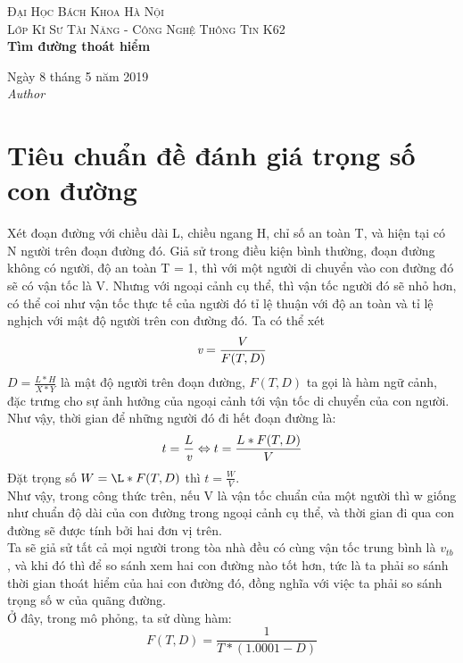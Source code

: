 \documentclass{article}
\begin{document}
\textsc{\LARGE Đại Học Bách Khoa Hà Nội} \\[1,5cm]
\textsc{\large Lớp Kĩ Sư Tài Năng - Công Nghệ Thông Tin K62} \\[0.5cm]
{\huge\bfseries Tìm đường thoát hiểm }\\[0.4cm] 

    \begin{flushleft}
        \large
        Ngày 8 tháng 5 năm 2019 \\[0.5cm]
        \textit{Author}\\[0,3cm]
           
    \end{flushleft}
    
    \section{Tiêu chuẩn đề đánh giá trọng số con đường}
    Xét đoạn đường với chiều dài L, chiều ngang H, chỉ số an toàn T,
    và hiện tại có N người trên đoạn đường đó. Giả sử trong điều 
    kiện bình thường, đoạn đường không có người, độ an toàn T = 1, 
    thì với một người di chuyển vào con đường đó sẽ có vận tốc là V.
    Nhưng với ngoại cảnh cụ thể, thì vận tốc người đó sẽ nhỏ hơn,
    có thể coi như vận tốc thực tế của người đó tỉ lệ thuận với độ 
    an toàn và tỉ lệ nghịch với mật độ người trên con đường đó.
    Ta có thể xét 
    \begin{equation*}
        \emph{v} = \frac{V}{F(T, D)}
    \end{equation*} 
    $D = \frac{L*H}{X*Y}$ là mật độ người trên đoạn đường,
    $F(T, D)$ ta gọi là hàm ngữ cảnh, đặc trưng cho sự ảnh hưởng
    của ngoại cảnh tới vận tốc di chuyển của con người.
    Như vậy, thời gian để những người đó đi hết đoạn đường là:
    \begin{displaymath}
        t = \frac{L}{\emph{v}}  
        \Leftrightarrow t = \frac{L*F(T, D)}{V}   
    \end{displaymath}
    Đặt trọng số $W = \L*F(T, D)$ thì $t = \frac{W}{V}$. \\
    Như vậy, trong công thức trên, nếu V là vận tốc chuẩn của một 
    người thì w giống như chuẩn độ dài của con đường trong ngoại 
    cảnh cụ thể, và thời gian đi qua con đường sẽ được tính bởi 
    hai đơn vị trên. \\
    Ta sẽ giả sử tất cả mọi người trong tòa nhà đều có cùng vận tốc
    trung bình là $v_{tb}$, và khi đó thì để so sánh xem hai con
    đường nào tốt hơn, tức là ta phải so sánh thời gian thoát hiểm 
    của hai con đường đó, đồng nghĩa với việc ta phải so sánh trọng 
    số w của quãng đường. \\ 
    Ở đây, trong mô phỏng, ta sử dùng hàm:
    \begin{equation}
        F(T, D) = \frac{1}{T * (1.0001 - D)}
    \end{equation}
    
\end{document}
